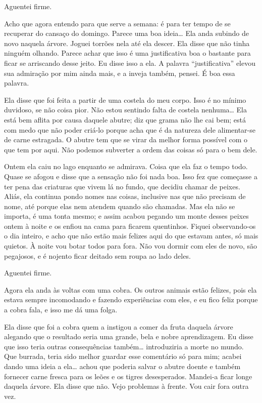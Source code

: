    Aguentei firme. 

   Acho que agora entendo para que serve a semana: é para ter tempo
de se recuperar do cansaço do domingo. Parece uma boa ideia\ldots{} Ela anda
subindo de novo naquela árvore. Joguei torrões nela até ela descer.
Ela disse que não tinha ninguém olhando. Parece achar que isso é uma justificativa boa
o bastante para ficar se arriscando desse jeito. Eu disse isso a ela. A palavra
``justificativa'' elevou sua admiração por mim  ainda mais, e a inveja também,
pensei. É boa essa palavra.

   Ela disse que foi feita a partir de uma costela do meu corpo. Isso
é no mínimo duvidoso, se não coisa pior. Não estou sentindo falta de costela
nenhuma\ldots{} Ela está bem aflita por causa daquele abutre; diz que grama não lhe
cai bem; está com medo que não poder criá-lo porque acha que é da
natureza dele alimentar-se de carne estragada. O abutre tem que se virar da
melhor forma possível com o que tem por aqui. Não podemos subverter a ordem
das coisas só para o bem dele.

  Ontem ela caiu no lago enquanto se admirava. Coisa que ela faz o
tempo todo. Quase se afogou e disse que a sensação não foi nada boa. Isso
fez que começasse a ter pena das criaturas que vivem lá no fundo, que 
decidiu chamar de peixes. Aliás, ela continua pondo nomes nas coisas, inclusive
nas que não precisam de nome, até porque elas nem atendem quando são chamadas.
Mas ela não se importa, é uma tonta mesmo; e assim acabou pegando um monte
desses peixes ontem à noite e os enfiou na cama para ficarem quentinhos. Fiquei
observando-os o dia inteiro, e acho que não estão mais felizes aqui do que
estavam antes, só mais quietos. À noite vou botar todos para fora. Não vou
dormir com eles de novo, são pegajosos, e é nojento ficar
deitado sem roupa ao lado deles.

  Aguentei firme.

   Agora ela anda às voltas com uma cobra. Os outros animais estão
felizes, pois ela estava sempre incomodando e fazendo experiências com eles, e
eu fico feliz porque a cobra fala, e isso me dá uma folga.

  Ela disse que foi a cobra quem a instigou a comer da fruta daquela
árvore alegando que o resultado seria uma grande, bela e nobre
aprendizagem. Eu disse que isso teria outras consequências também\ldots{} introduziria
a morte no mundo. Que burrada, teria sido melhor guardar esse comentário só
para mim; acabei dando uma ideia a ela\ldots{} achou que poderia salvar o abutre doente
e também fornecer carne fresca para os leões e os tigres desesperados. Mandei-a
ficar longe daquela árvore. Ela disse que não. Vejo problemas à frente. Vou cair fora outra vez.

